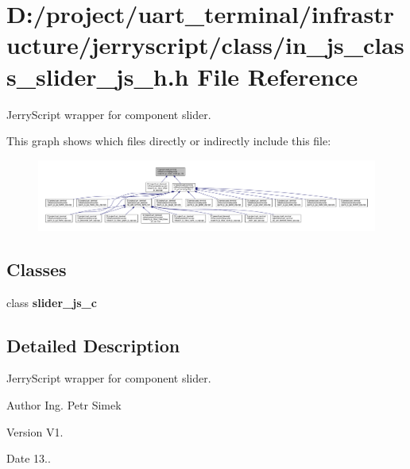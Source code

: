 \section{D\+:/project/uart\+\_\+terminal/infrastructure/jerryscript/class/in\+\_\+js\+\_\+class\+\_\+slider\+\_\+js\+\_\+h.h File Reference}
\label{in__js__class__slider__js__h_8h}


Jerry\+Script wrapper for component slider.  


This graph shows which files directly or indirectly include this file\+:
\nopagebreak
\begin{figure}[H]
\begin{center}
\leavevmode
\includegraphics[width=350pt]{in__js__class__slider__js__h_8h__dep__incl}
\end{center}
\end{figure}
\subsection*{Classes}
\begin{DoxyCompactItemize}
\item 
class \textbf{ slider\+\_\+js\+\_\+c}
\end{DoxyCompactItemize}


\subsection{Detailed Description}
Jerry\+Script wrapper for component slider. 

\begin{DoxyAuthor}{Author}
Ing. Petr Simek 
\end{DoxyAuthor}
\begin{DoxyVersion}{Version}
V1. 
\end{DoxyVersion}
\begin{DoxyDate}{Date}
13.. 
\end{DoxyDate}
